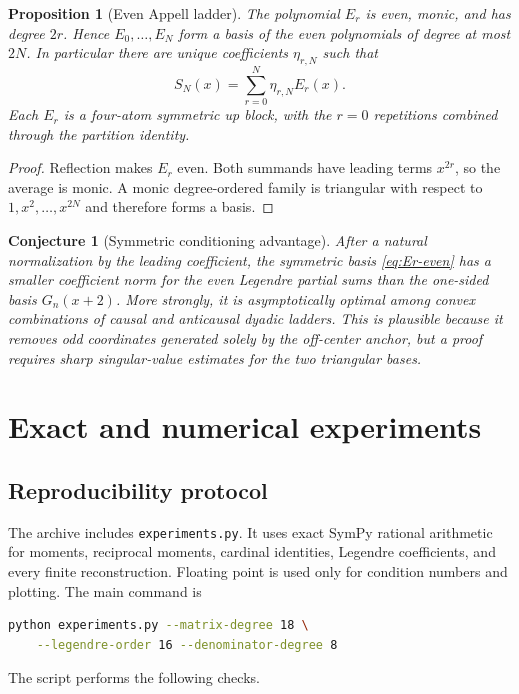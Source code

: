 \documentclass[11pt,oneside]{article}
\newtheorem{proposition}[theorem]{Proposition}
\newtheorem{conjecture}[theorem]{Conjecture}
\theoremstyle{definition}
\theoremstyle{remark}
\begin{document}
\begin{proposition}[Even Appell ladder]
\label{prop:even-ladder}
The polynomial $E_r$ is even, monic, and has degree $2r$.  Hence
$E_0,\ldots,E_N$ form a basis of the even polynomials of degree at most
$2N$.  In particular there are unique coefficients $\eta_{r,N}$ such that
\begin{equation}
 S_N(x)=\sum_{r=0}^{N}\eta_{r,N}E_r(x).
 \label{eq:even-SN}
\end{equation}
Each $E_r$ is a four-atom symmetric up block, with the $r=0$ repetitions
combined through the partition identity.
\end{proposition}

\begin{proof}
Reflection makes $E_r$ even.  Both summands have leading terms $x^{2r}$, so
the average is monic.  A monic degree-ordered family is triangular with
respect to $1,x^2,\ldots,x^{2N}$ and therefore forms a basis.
\end{proof}

\begin{conjecture}[Symmetric conditioning advantage]
\label{conj:symmetric-conditioning}
After a natural normalization by the leading coefficient, the symmetric
basis \eqref{eq:Er-even} has a smaller coefficient norm for the even
Legendre partial sums than the one-sided basis $G_n(x+2)$.  More strongly,
it is asymptotically optimal among convex combinations of causal and
anticausal dyadic ladders.  This is plausible because it removes odd
coordinates generated solely by the off-center anchor, but a proof requires
sharp singular-value estimates for the two triangular bases.
\end{conjecture}

\section{Exact and numerical experiments}
\label{sec:numerics}

\subsection{Reproducibility protocol}
The archive includes \texttt{experiments.py}.  It uses exact SymPy rational
arithmetic for moments, reciprocal moments, cardinal identities, Legendre
coefficients, and every finite reconstruction.  Floating point is used only
for condition numbers and plotting.  The main command is
\begin{lstlisting}[style=code,language=bash]
python experiments.py --matrix-degree 18 \
    --legendre-order 16 --denominator-degree 8
\end{lstlisting}
The script performs the following checks.
\end{document}
